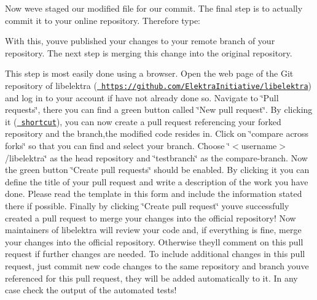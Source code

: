 \begin{DoxyCode}{0}
\end{DoxyCode}


Now we\textquotesingle{}ve staged our modified file for our commit. The final step is to actually commit it to your online repository. Therefore type\+:


\begin{DoxyCode}{0}
\end{DoxyCode}


With this, you\textquotesingle{}ve published your changes to your remote branch of your repository. The next step is merging this change into the original repository.

This step is most easily done using a browser. Open the web page of the Git repository of libelektra (\href{https://github.com/ElektraInitiative/libelektra}{\texttt{ https\+://github.\+com/\+Elektra\+Initiative/libelektra}}) and log in to your account if have not already done so. Navigate to \char`\"{}\+Pull
requests\char`\"{}, there you can find a green button called \char`\"{}\+New pull request\char`\"{}. By clicking it (\href{https://github.com/ElektraInitiative/libelektra/compare}{\texttt{ shortcut}}), you can now create a pull request referencing your forked repository and the branch,the modified code resides in. Click on \char`\"{}compare across forks\char`\"{} so that you can find and select your branch. Choose \char`\"{}$<$username$>$/libelektra\char`\"{} as the head repository and \char`\"{}testbranch\char`\"{} as the compare-\/branch. Now the green button \char`\"{}\+Create pull requests\char`\"{} should be enabled. By clicking it you can define the title of your pull request and write a description of the work you have done. Please read the template in this form and include the information stated there if possible. Finally by clicking \char`\"{}\+Create pull request\char`\"{} you\textquotesingle{}ve successfully created a pull request to merge your changes into the official repository! Now maintainers of libelektra will review your code and, if everything is fine, merge your changes into the official repository. Otherwise they\textquotesingle{}ll comment on this pull request if further changes are needed. To include additional changes in this pull request, just commit new code changes to the same repository and branch you\textquotesingle{}ve referenced for this pull request, they will be added automatically to it. In any case check the output of the automated tests!

